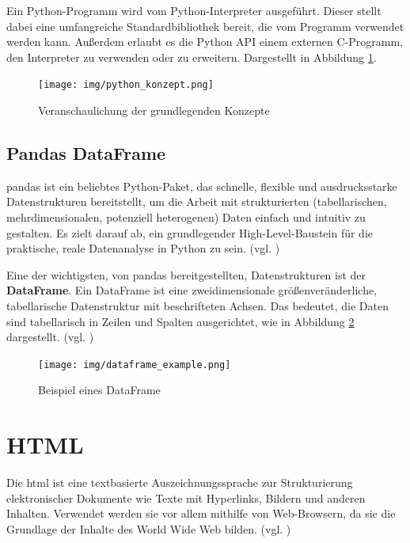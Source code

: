 \documentclass[oneside]{ausarbeitung}
\begin{document}
Ein Python-Programm wird vom Python-Interpreter ausgeführt. Dieser
stellt dabei eine umfangreiche Standardbibliothek bereit, die vom
Programm verwendet werden kann. Außerdem erlaubt es die Python API
einem externen C-Programm, den Interpreter zu verwenden oder zu
erweitern. Dargestellt in Abbildung \ref{fig:6}.

\begin{figure}[H]
  \centering
  \texttt{[image: img/python\_konzept.png]}
  \caption{Veranschaulichung der grundlegenden Konzepte\cite{python_konzepte}}
  \label{fig:6}
\end{figure}

\subsection{Pandas DataFrame}
\label{sub:dataframe}

\ac{pandas} ist ein beliebtes Python-Paket, das schnelle, flexible und ausdrucksstarke Datenstrukturen bereitstellt, um die Arbeit mit strukturierten (tabellarischen, mehrdimensionalen, potenziell heterogenen) Daten einfach und intuitiv zu gestalten. Es zielt darauf ab, ein grundlegender High-Level-Baustein für die praktische, reale Datenanalyse in Python zu sein. (vgl. \cite{pandas_definition})

Eine der wichtigsten, von pandas bereitgestellten, Datenstrukturen ist der \textbf{DataFrame}. Ein DataFrame ist eine zweidimensionale größenveränderliche, tabellarische Datenstruktur mit beschrifteten Achsen. Das bedeutet, die Daten sind tabellarisch in Zeilen und Spalten ausgerichtet, wie in Abbildung \ref{fig:8} dargestellt. (vgl. \cite{dataframe_example})

\begin{figure}[H]
  \centering
  \texttt{[image: img/dataframe\_example.png]}
  \caption{Beispiel eines DataFrame\cite{dataframe_example}}
  \label{fig:8}
\end{figure}


\section{HTML}
\label{sec:html}

Die \ac{html} ist eine textbasierte Auszeichnungssprache zur Strukturierung elektronischer Dokumente wie Texte mit Hyperlinks, Bildern und anderen Inhalten. Verwendet werden sie vor allem mithilfe von Web-Browsern, da sie die Grundlage der Inhalte des World Wide Web bilden. (vgl. \cite{html})
\end{document}
